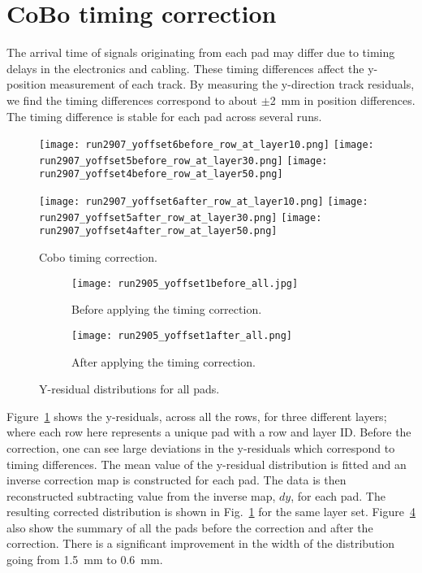 \section{CoBo timing correction}
The arrival time of signals originating from each pad may differ due to timing delays in the electronics and cabling. These timing differences affect the y-position measurement of each track. By measuring the y-direction track residuals, we find the timing differences correspond to about $\pm$\SI{2}{\milli\metre} in position differences. The timing difference is stable for each pad across several runs. 

\begin{figure}[!htb]
  \begin{center}
    \texttt{[image: run2907\_yoffset6before\_row\_at\_layer10.png]}
    \texttt{[image: run2907\_yoffset5before\_row\_at\_layer30.png]}
    \texttt{[image: run2907\_yoffset4before\_row\_at\_layer50.png]}
 
    \texttt{[image: run2907\_yoffset6after\_row\_at\_layer10.png]}
    \texttt{[image: run2907\_yoffset5after\_row\_at\_layer30.png]}
    \texttt{[image: run2907\_yoffset4after\_row\_at\_layer50.png]}
 
  \end{center}
  \caption{Cobo timing correction.}
  \label{fig:coboCorr}
\end{figure}



\begin{figure}[!htb]
    \begin{subfigure}[t]{.49\textwidth}
        \centering
        \texttt{[image: run2905\_yoffset1before\_all.jpg]} 
        \caption{Before applying the timing correction.} \label{fig:yoff_allBefore}
    \end{subfigure}
    \hfill
    \begin{subfigure}[t]{.49\textwidth}
        \centering
        \texttt{[image: run2905\_yoffset1after\_all.png]}
        \caption{After applying the timing correction.} \label{fig:yoff_allAfter}
    \end{subfigure}
    \caption{Y-residual distributions for all pads.}
\label{fig:yoff}
\end{figure}


 Figure~\ref{fig:coboCorr} shows the y-residuals, across all the rows, for three different layers; where each row here represents a unique pad with a row and layer ID. Before the correction, one can see large deviations in the y-residuals which correspond to timing differences. The mean value of the y-residual distribution is fitted and an inverse correction map is constructed for each pad. The data is then reconstructed subtracting value from the inverse map, $dy$, for each pad. The resulting corrected distribution is shown in Fig.~\ref{fig:coboCorr} for the same layer set. Figure~\ref{fig:yoff} also show the summary of all the pads before the correction and after the correction. There is a significant improvement in the width of the distribution going from \SI{1.5}{\milli\metre} to \SI{0.6}{\milli\metre}. 



